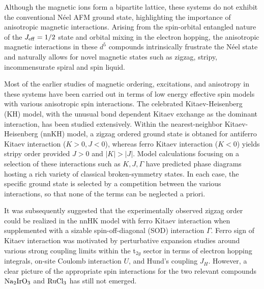 \documentclass[aps,prb,fleqn,12pt,amsmath,amssymb]{revtex4}
\begin{document}
Although the magnetic ions form a bipartite lattice, these systems do not exhibit the conventional N\'{e}el AFM ground state, highlighting the importance of anisotropic magnetic interactions. Arising from the spin-orbital entangled nature of the $J_{\rm eff} = 1/2$ state and orbital mixing in the electron hopping, the anisotropic magnetic interactions in these $d^5$ compounds intrinsically frustrate the N\'{e}el state and naturally allows for novel magnetic states such as zigzag, stripy, incommensurate spiral and spin liquid.\cite{chaloupka_PRL_2010} 

Most of the earlier studies of magnetic ordering, excitations, and anisotropy in these systems have been carried out in terms of low energy effective spin models with various anisotropic spin interactions. The celebrated Kitaev-Heisenberg (KH) model, with the unusual bond dependent Kitaev exchange as the dominant interaction, has been studied extensively.\cite{chaloupka_PRL_2010,chaloupka_PRL_2013,plumb_PRB_2014,sandilands_PRL_2015,kim_PRB_2015,chaloupka_PRB_2016,ysingh_PRL_2012,rau_PRL_2014,chaloupka_PRB_2015,ran_PRL_2017,wang_PRB_17,janssen_arxiv_2017}
Within the nearest-neighbor Kitaev-Heisenberg (nnKH) model, a zigzag ordered ground state is obtaned  for antiferro Kitaev interaction ($K > 0, J < 0$), whereas ferro Kitaev interaction ($K < 0$) yields stripy order provided $J > 0$ and $|K|>|J|$. Model calculations focusing on a selection of these interactions such as $K,J,\Gamma$ have predicted phase diagrams hosting a rich variety of classical broken-symmetry states.\cite{chaloupka_PRL_2013,rau_PRL_2014,sizyuk_PRB_2014,katukuri_NJP_2014,chaloupka_PRB_2015} In each case, the specific ground state is selected by a competition between the various interactions, so that none of the terms can be neglected a priori. 

It was subsequently suggested that the experimentally observed zigzag order could be realized in the nnHK model with ferro Kitaev interaction when supplemented with a sizable spin-off-diagonal (SOD) interaction $\Gamma$.\cite{rau_PRL_2014,chaloupka_PRB_2015,ran_PRL_2017,wang_PRB_17,janssen_arxiv_2017} 
Ferro sign of Kitaev interaction was motivated by perturbative expansion studies around various strong coupling limits within the t$_{2g}$ sector in terms of electron hopping integrals, on-site Coulomb interaction $U$, and Hund’s coupling $J_H$.\cite{rau_PRL_2014,sizyuk_PRB_2014,yamaji_PRL_2014,winter_PRB_2016} However, a clear picture of the appropriate spin interactions for the two relevant compounds $\rm Na_2 Ir O_3$ and $\rm Ru Cl_3$ has still not emerged. 
\end{document}
